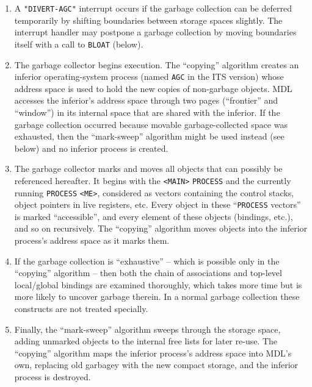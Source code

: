 \documentclass[a4paper]{scrbook}
\providecommand{\tightlist}{%
  \setlength{\itemsep}{0pt}\setlength{\parskip}{0pt}}
\begin{document}
\begin{enumerate}
\def\labelenumi{\arabic{enumi}.}
\tightlist
\item
  A \texttt{"DIVERT-AGC"}  interrupt occurs if the garbage collection can be deferred
  temporarily by shifting boundaries between storage spaces slightly. The interrupt handler may postpone a garbage
  collection by moving boundaries itself with a call to \texttt{BLOAT} (below).
\item
  The garbage collector begins execution. The ``copying'' algorithm creates an inferior operating-system process (named
  \texttt{AGC} in the ITS version) whose address space is used to hold the new copies of non-garbage
  objects. MDL accesses the inferior's address space through two pages (``frontier'' and ``window'') in its internal space
  that are shared with the inferior. If the garbage collection occurred because movable garbage-collected space was
  exhausted, then the ``mark-sweep'' algorithm might be used instead (see below) and no inferior process is created.
\item
  The garbage collector marks and moves all objects that can possibly be referenced hereafter. It begins with the
  \texttt{\textless{}MAIN\textgreater{}} \texttt{PROCESS} and the currently running \texttt{PROCESS}
  \texttt{\textless{}ME\textgreater{}}, considered as vectors containing the control stacks, object
  pointers in live registers, etc. Every object in these ``\texttt{PROCESS} vectors'' is marked ``accessible'', and every
  element of these objects (bindings, etc.), and so on recursively. The ``copying'' algorithm moves objects into the
  inferior process's address space as it marks them.
\item
  If the garbage collection is ``exhaustive'' -- which is possible only in the ``copying'' algorithm -- then both the chain
  of associations and top-level local/global bindings are examined thoroughly, which takes more time but is more likely to
  uncover garbage therein. In a normal garbage collection these constructs are not treated specially.
\item
  Finally, the ``mark-sweep'' algorithm sweeps through the storage space, adding unmarked objects to the internal free
  lists for later re-use. The ``copying'' algorithm maps the inferior process's address space into MDL's own, replacing old
  garbagey with the new compact storage, and the inferior process is destroyed.
\end{enumerate}
\end{document}
